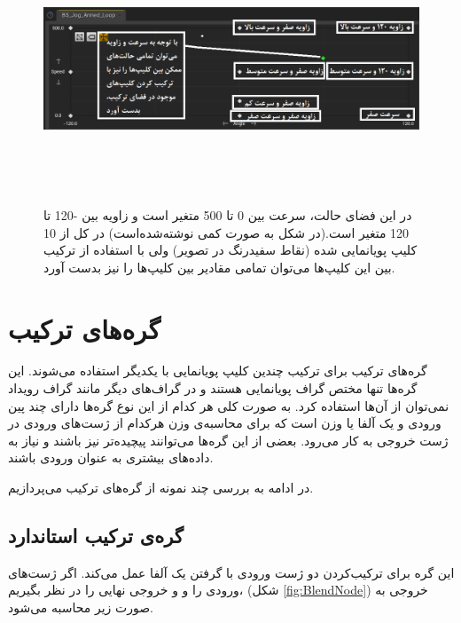 \begin{figure}[ht]
	\centerline{\includegraphics[width=\textwidth,height=8cm,keepaspectratio]{Figures/Ch3/BlendSpace.png}}

	\caption{در این فضای حالت، سرعت بین 0 تا 500 متغیر است و زاویه بین -120 تا 120 متغیر است.(در شکل به صورت کمی نوشته‌شده‌است)
	در کل از 10 کلیپ پویانمایی شده (نقاط سفیدرنگ در تصویر) ولی با استفاده از ترکیب بین این کلیپ‌ها می‌توان تمامی مقادیر بین کلیپ‌ها را نیز بدست آورد. }
	\label{fig:BlendSpace}
\end{figure}


\section {گره‌های ترکیب}

گره‌های ترکیب برای ترکیب چندین کلیپ پویانمایی با یکدیگر استفاده‌ می‌شوند.
این گره‌‌ها تنها مختص گراف پویانمایی هستند و در گراف‌های دیگر مانند گراف رویداد 
نمی‌توان از آن‌ها استفاده کرد.
به صورت کلی هر کدام از این نوع گره‌ها دارای چند پین ورودی و 
یک آلفا یا وزن است که برای محاسبه‌ی 
وزن هرکدام از ژست‌های ورودی در ژست خروجی به کار می‌رود.
بعضی از این گره‌‌ها می‌توانند 
پیچیده‌تر نیز باشند و نیاز به داده‌های بیشتری به عنوان ورودی باشند.

در ادامه به بررسی چند نمونه از گره‌‌های ترکیب می‌پردازیم.

\subsection{ گره‌ی ترکیب استاندارد}

این گره برای ترکیب‌کردن دو ژست ورودی با گرفتن یک آلفا عمل می‌کند.
اگر ژست‌های ورودی را
و 
 و
خروجی نهایی را 
در نظر بگیریم، 
(شکل \ref{fig:BlendNode})
خروجی به صورت زیر محاسبه می‌شود.

